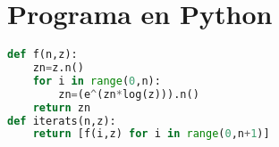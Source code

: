 \documentclass[11pt,a4paper]{article}
\theoremstyle{definition}
\begin{document}
\section{Programa en Python}\label{appendix1}
\begin{lstlisting}[language=Python, caption={Programa que calcula la llista dels $n$ primers termes de la successió \eqref{iteracio} partint de $z_0=z$}]
def f(n,z):
    zn=z.n()
    for i in range(0,n):
        zn=(e^(zn*log(z))).n()
    return zn
def iterats(n,z):
    return [f(i,z) for i in range(0,n+1)]
\end{lstlisting}
\printbibliography[heading=bibintoc,title={Referències}]
\end{document}
